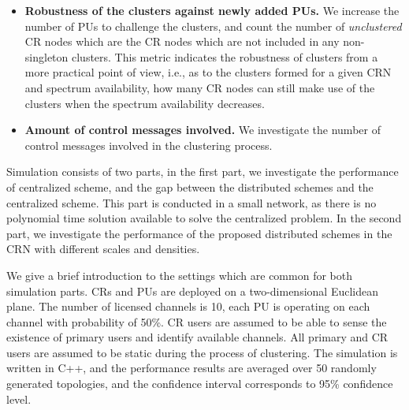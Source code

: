 \documentclass[10pt,journal,compsoc]{IEEEtran}
\theoremstyle{mytheoremstyle}
\theoremstyle{mytheoremstyle}
\theoremstyle{mytheoremstyle}
\newcommand{\eg}{e.g., }
\newcommand{\ie}{i.e., }
\begin{document}
\begin{itemize}
\item \textbf{Robustness of the clusters against newly added PUs.}
We increase the number of PUs to challenge the clusters, and count the number of \textit{unclustered} CR nodes which are the CR nodes which are not included in any non-singleton clusters.
This metric indicates the robustness of clusters from a more practical point of view, \ie as to the clusters formed for a given CRN and spectrum availability, how many CR nodes can still make use of the clusters when the spectrum availability decreases.


\item \textbf{Amount of control messages involved.}
We investigate the number of control messages involved in the clustering process.

\end{itemize}

Simulation consists of two parts, in the first part, we investigate the performance of centralized scheme, and the gap between the distributed schemes and the centralized scheme.
This part is conducted in a small network, as there is no polynomial time solution available to solve the centralized problem.
In the second part, we investigate the performance of the proposed distributed schemes in the CRN with different scales and densities.

We give a brief introduction to the settings which are common for both simulation parts.
CRs and PUs are deployed on a two-dimensional Euclidean plane.
The number of licensed channels is 10, each PU is operating on each channel with probability of 50\%.
CR users are assumed to be able to sense the existence of primary users and identify available channels.
All primary and CR users are assumed to be static during the process of clustering.
The simulation is written in C++, and the performance results are averaged over 50 randomly generated topologies, and the confidence interval corresponds to 95\% confidence level.
\end{document}
